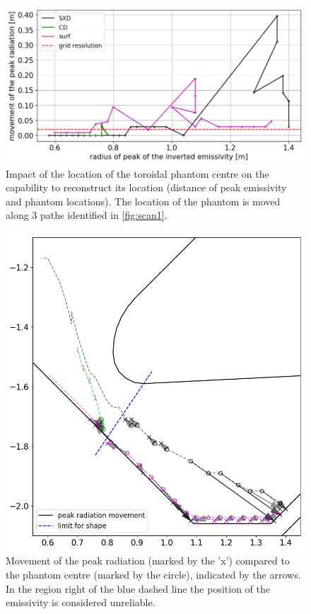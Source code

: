 \begin{figure}[!ht]
         \centering
         \includegraphics[trim={0 0 0 0},clip,width=0.7\linewidth]{Chapters/chapter2/figs/position_error.png}
    \caption{Impact of the location of the toroidal phantom centre on the capability to reconstruct its location (distance of peak emissivity and phantom locations). The location of the phantom is moved along 3 paths identified in \autoref{fig:scan1}.}
    \label{fig:scan2a}
\end{figure}

\begin{figure}[!ht]
	\centering
	\includegraphics[trim={0 0 0 0},clip,width=0.6\linewidth]{Chapters/chapter2/figs/radiation_movement.png}
	\caption{Movement of the peak radiation (marked by the 'x') compared to the phantom centre (marked by the circle), indicated by the arrows. In the region right of the blue dashed line the position of the emissivity is considered unreliable.}
	\label{fig:scan3}
\end{figure}


